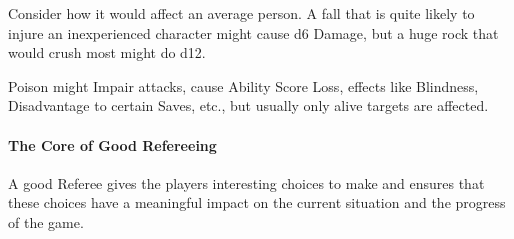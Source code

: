 \documentclass[itdr]{subfiles}
\begin{document}
Consider how it would affect an average person. A fall that is quite likely to injure an inexperienced character might cause d6 Damage, but a huge rock that would crush most might do d12.

Poison might Impair attacks, cause Ability Score Loss, effects like Blindness, Disadvantage to certain Saves, etc., but usually only alive targets are affected.

\paragraph{The Core of Good Refereeing}
A good Referee gives the players interesting choices to make and ensures that these choices have a meaningful impact on the current situation and the progress of the game.
\end{document}
